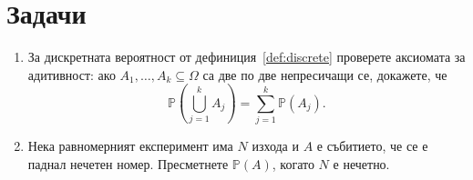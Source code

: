 \section{Задачи}

\begin{enumerate}
    \item За дискретната вероятност от дефиниция~\ref{def:discrete} проверете аксиомата за адитивност: ако $A_1,\dots,A_k \subseteq \Omega$ са две по две непресичащи се, докажете, че
    \[
    \mathbb{P}\left(\bigcup_{j=1}^k A_j\right)
    = \sum_{j=1}^k \mathbb{P}(A_j).
    \]
    \item Нека равномерният експеримент има $N$ изхода и $A$ е събитието, че се е паднал нечетен номер. Пресметнете $\mathbb{P}(A)$, когато $N$ е нечетно.
\end{enumerate}
